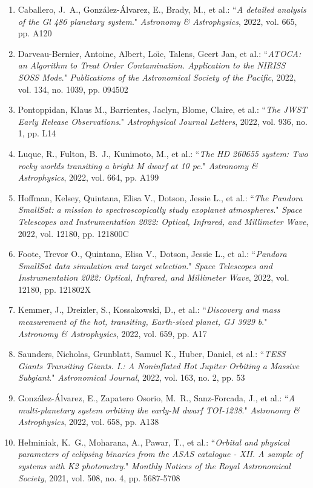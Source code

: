\documentclass[12pt, a4paper]{article} %
\begin{document}
\begin{flushleft}
\begin{enumerate}
\item Caballero, J.~A., González-Álvarez, E., Brady, M., et al.: ``\textit{A detailed analysis of the Gl 486 planetary system}." \textit{Astronomy \& Astrophysics}, 2022, vol. 665, pp. A120
\item Darveau-Bernier, Antoine, Albert, Loı̈c, Talens, Geert Jan, et al.: ``\textit{ATOCA: an Algorithm to Treat Order Contamination. Application to the NIRISS SOSS Mode}." \textit{Publications of the Astronomical Society of the Pacific}, 2022, vol. 134, no. 1039, pp. 094502
\item Pontoppidan, Klaus M., Barrientes, Jaclyn, Blome, Claire, et al.: ``\textit{The JWST Early Release Observations}." \textit{Astrophysical Journal Letters}, 2022, vol. 936, no. 1, pp. L14
\item Luque, R., Fulton, B.~J., Kunimoto, M., et al.: ``\textit{The HD 260655 system: Two rocky worlds transiting a bright M dwarf at 10 pc}." \textit{Astronomy \& Astrophysics}, 2022, vol. 664, pp. A199
\item Hoffman, Kelsey, Quintana, Elisa V., Dotson, Jessie L., et al.: ``\textit{The Pandora SmallSat: a mission to spectroscopically study exoplanet atmospheres}." \textit{Space Telescopes and Instrumentation 2022: Optical, Infrared, and Millimeter Wave}, 2022, vol. 12180, pp. 121800C
\item Foote, Trevor O., Quintana, Elisa V., Dotson, Jessie L., et al.: ``\textit{Pandora SmallSat data simulation and target selection}." \textit{Space Telescopes and Instrumentation 2022: Optical, Infrared, and Millimeter Wave}, 2022, vol. 12180, pp. 121802X
\item Kemmer, J., Dreizler, S., Kossakowski, D., et al.: ``\textit{Discovery and mass measurement of the hot, transiting, Earth-sized planet, GJ 3929 b}." \textit{Astronomy \& Astrophysics}, 2022, vol. 659, pp. A17
\item Saunders, Nicholas, Grunblatt, Samuel K., Huber, Daniel, et al.: ``\textit{TESS Giants Transiting Giants. I.: A Noninflated Hot Jupiter Orbiting a Massive Subgiant}." \textit{Astronomical Journal}, 2022, vol. 163, no. 2, pp. 53
\item González-Álvarez, E., Zapatero Osorio, M.~R., Sanz-Forcada, J., et al.: ``\textit{A multi-planetary system orbiting the early-M dwarf TOI-1238}." \textit{Astronomy \& Astrophysics}, 2022, vol. 658, pp. A138
\item Hełminiak, K.~G., Moharana, A., Pawar, T., et al.: ``\textit{Orbital and physical parameters of eclipsing binaries from the ASAS catalogue - XII. A sample of systems with K2 photometry}." \textit{Monthly Notices of the Royal Astronomical Society}, 2021, vol. 508, no. 4, pp. 5687-5708

\end{enumerate}
\end{flushleft}
\end{document}
